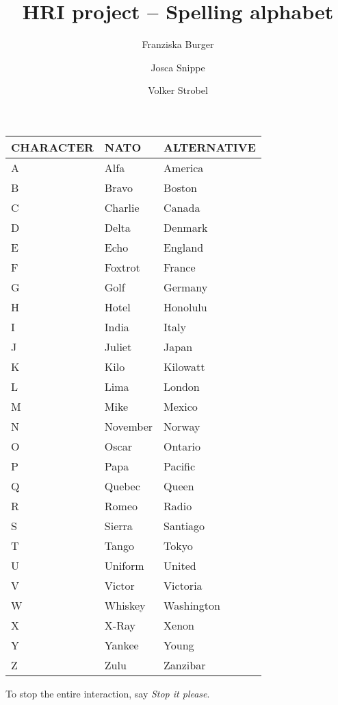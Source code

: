 \documentclass{scrartcl}
\title{HRI project -- Spelling alphabet}
\author{Franziska Burger\and Josca Snippe\and Volker Strobel}
\begin{document}
\maketitle
\vspace*{-1em}
\begin{table}[h]
  \centering
  \begin{tabular}{lll}
    \toprule
    CHARACTER & NATO & ALTERNATIVE\\
    \midrule
    A & Alfa & America\\
    B & Bravo & Boston\\
    C & Charlie & Canada\\
    D & Delta  & Denmark\\
    E & Echo & England\\
    F & Foxtrot & France\\
    G & Golf & Germany\\
    H & Hotel & Honolulu\\
    I & India & Italy\\
    J & Juliet & Japan\\
    K & Kilo & Kilowatt\\
    L & Lima & London\\
    M & Mike & Mexico\\
    N & November & Norway\\
    O & Oscar & Ontario\\
    P & Papa & Pacific\\
    Q & Quebec & Queen\\
    R & Romeo & Radio\\
    S & Sierra & Santiago\\
    T & Tango & Tokyo\\
    U & Uniform & United\\
    V & Victor & Victoria\\
    W & Whiskey & Washington\\
    X & X-Ray & Xenon\\
    Y & Yankee & Young\\
    Z & Zulu & Zanzibar\\    
    \bottomrule
  \end{tabular}
\end{table}
\vspace*{0.5em}
To stop the entire interaction, say \emph{Stop it please}.
\end{document}
